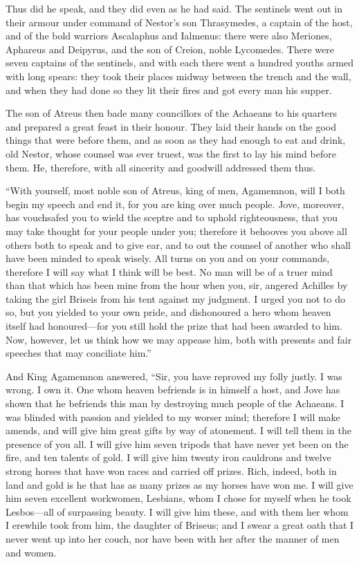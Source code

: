 Thus did he speak, and they did even as he had said. The sentinels went
out in their armour under command of Nestor’s son Thrasymedes, a captain
of the host, and of the bold warriors Ascalaphus and Ialmenus: there were
also Meriones, Aphareus and Deipyrus, and the son of Creion, noble
Lycomedes. There were seven captains of the sentinels, and with each there
went a hundred youths armed with long spears: they took their places
midway between the trench and the wall, and when they had done so they lit
their fires and got every man his supper.

The son of Atreus then bade many councillors of the Achaeans to his
quarters and prepared a great feast in their honour. They laid their hands
on the good things that were before them, and as soon as they had enough
to eat and drink, old Nestor, whose counsel was ever truest, was the first
to lay his mind before them. He, therefore, with all sincerity and
goodwill addressed them thus.

“With yourself, most noble son of Atreus, king of men, Agamemnon, will I
both begin my speech and end it, for you are king over much people. Jove,
moreover, has vouchsafed you to wield the sceptre and to uphold
righteousness, that you may take thought for your people under you;
therefore it behooves you above all others both to speak and to give ear,
and to out the counsel of another who shall have been minded to speak
wisely. All turns on you and on your commands, therefore I will say what I
think will be best. No man will be of a truer mind than that which has
been mine from the hour when you, sir, angered Achilles by taking the girl
Briseis from his tent against my judgment. I urged you not to do so, but
you yielded to your own pride, and dishonoured a hero whom heaven itself
had honoured—for you still hold the prize that had been awarded to
him. Now, however, let us think how we may appease him, both with presents
and fair speeches that may conciliate him.”

And King Agamemnon answered, “Sir, you have reproved my folly justly. I
was wrong. I own it. One whom heaven befriends is in himself a host, and
Jove has shown that he befriends this man by destroying much people of the
Achaeans. I was blinded with passion and yielded to my worser mind;
therefore I will make amends, and will give him great gifts by way of
atonement. I will tell them in the presence of you all. I will give him
seven tripods that have never yet been on the fire, and ten talents of
gold. I will give him twenty iron cauldrons and twelve strong horses that
have won races and carried off prizes. Rich, indeed, both in land and gold
is he that has as many prizes as my horses have won me. I will give him
seven excellent workwomen, Lesbians, whom I chose for myself when he took
Lesbos—all of surpassing beauty. I will give him these, and with
them her whom I erewhile took from him, the daughter of Briseus; and I
swear a great oath that I never went up into her couch, nor have been with
her after the manner of men and women.


